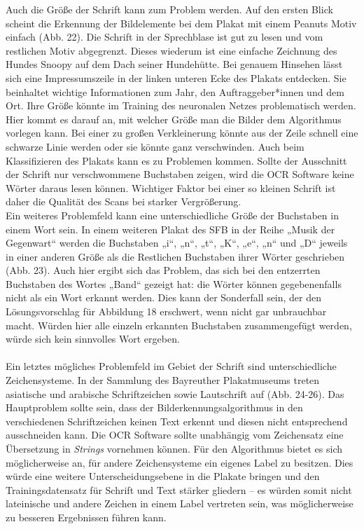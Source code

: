 \documentclass[a4paper,12pt,ngerman]{article}
\begin{document}
Auch die Größe der Schrift kann zum Problem werden. Auf den ersten Blick scheint die Erkennung der Bildelemente bei dem Plakat mit einem Peanuts Motiv einfach (Abb. 22). Die Schrift in der Sprechblase ist gut zu lesen und vom restlichen Motiv abgegrenzt. Dieses wiederum ist eine einfache Zeichnung des Hundes Snoopy auf dem Dach seiner Hundehütte. Bei genauem Hinsehen lässt sich eine Impressumszeile in der linken unteren Ecke des Plakats entdecken. Sie beinhaltet wichtige Informationen zum Jahr, den Auftraggeber*innen und dem Ort. Ihre Größe könnte im Training des neuronalen Netzes problematisch werden. Hier kommt es darauf an, mit welcher Größe man die Bilder dem Algorithmus vorlegen kann. Bei einer zu großen Verkleinerung könnte aus der Zeile schnell eine schwarze Linie werden oder sie könnte ganz verschwinden. Auch beim Klassifizieren des Plakats kann es zu Problemen kommen. Sollte der Ausschnitt der Schrift nur verschwommene Buchstaben zeigen, wird die OCR Software keine Wörter daraus lesen können. Wichtiger Faktor bei einer so kleinen Schrift ist daher die Qualität des Scans bei starker Vergrößerung.\\
Ein weiteres Problemfeld kann eine unterschiedliche Größe der Buchstaben in einem Wort sein. In einem weiteren Plakat des SFB in der Reihe „Musik der Gegenwart“ werden die Buchstaben „i“, „n“, „t“, „K“, „e“, „n“ und „D“ jeweils in einer anderen Größe als die Restlichen Buchstaben ihrer Wörter geschrieben (Abb. 23). Auch hier ergibt sich das Problem, das sich bei den entzerrten Buchstaben des Wortes „Band“ gezeigt hat: die Wörter können gegebenenfalls nicht als ein Wort erkannt werden. Dies kann der Sonderfall sein, der den Lösungsvorschlag für Abbildung 18 erschwert, wenn nicht gar unbrauchbar macht. Würden hier alle einzeln erkannten Buchstaben zusammengefügt werden, würde sich kein sinnvolles Wort ergeben. \\
\\
Ein letztes mögliches Problemfeld im Gebiet der Schrift sind unterschiedliche Zeichensysteme. In der Sammlung des Bayreuther Plakatmuseums treten asiatische und arabische Schriftzeichen sowie Lautschrift auf (Abb. 24-26). Das Hauptproblem sollte sein, dass der Bilderkennungsalgorithmus in den verschiedenen Schriftzeichen keinen Text erkennt und diesen nicht entsprechend ausschneiden kann. Die OCR Software sollte unabhängig vom Zeichensatz eine Übersetzung in \textit{Strings} vornehmen können. Für den Algorithmus bietet es sich möglicherweise an, für andere Zeichensysteme ein eigenes Label zu besitzen. Dies würde eine weitere Unterscheidungsebene in die Plakate bringen und den Trainingsdatensatz für Schrift und Text stärker gliedern -- es würden somit nicht lateinische und andere Zeichen in einem Label vertreten sein, was möglicherweise zu besseren Ergebnissen führen kann. \\
\end{document}
